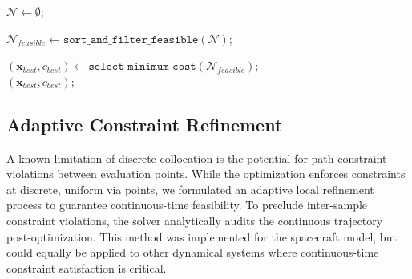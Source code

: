 \begin{algorithm}[H]
\caption{\texttt{IPSO\_GBO}}
\label{alg:ipso-gbo}

$\mathcal{N} \leftarrow \emptyset$; \\[0.5ex]


$\mathcal{N}_{feasible} \leftarrow \texttt{sort\_and\_filter\_feasible}(\mathcal{N})$; \\[0.5ex]


$(\mathbf{x}_{best}, c_{best}) \leftarrow \texttt{select\_minimum\_cost}(\mathcal{N}_{feasible})$; \\[0.5ex]
\Return $(\mathbf{x}_{best}, c_{best})$;
\end{algorithm}

\subsection{Adaptive Constraint Refinement}
\label{sec:adaptive_refinement}
A known limitation of discrete collocation is the potential for path constraint violations between evaluation points. 
While the optimization enforces constraints at discrete, uniform via points, we formulated an adaptive local refinement process to guarantee continuous-time feasibility. 
To preclude inter-sample constraint violations, the solver analytically audits the continuous trajectory post-optimization.
This method was implemented for the spacecraft model, but could equally be applied to other dynamical systems where continuous-time constraint satisfaction is critical.


